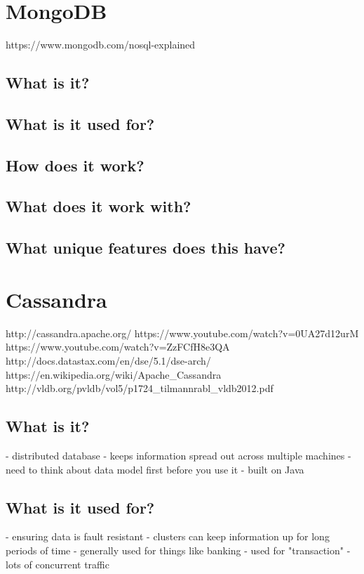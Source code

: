 \chapter{MongoDB}
https://www.mongodb.com/nosql-explained

\section{What is it?}

\section{What is it used for?}

\section{How does it work?}

\section{What does it work with?}

\section{What unique features does this have?}


\chapter{Cassandra}
http://cassandra.apache.org/
https://www.youtube.com/watch?v=0UA27d12urM
https://www.youtube.com/watch?v=ZzFCfH8e3QA
http://docs.datastax.com/en/dse/5.1/dse-arch/
https://en.wikipedia.org/wiki/Apache_Cassandra
http://vldb.org/pvldb/vol5/p1724_tilmannrabl_vldb2012.pdf

\section{What is it?}
- distributed database
- keeps information spread out across multiple machines
- need to think about data model first before you use it
- built on Java

\section{What is it used for?}
- ensuring data is fault resistant
- clusters can keep information up for long periods of time
- generally used for things like banking
- used for "transaction" - lots of concurrent traffic

